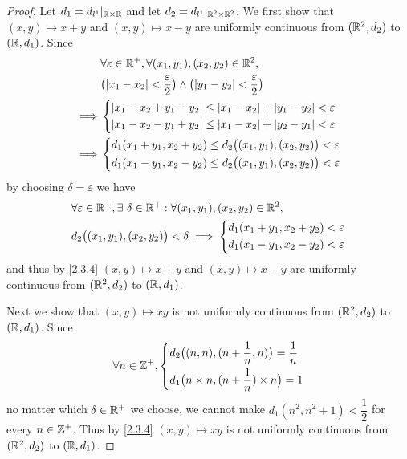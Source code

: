 \begin{proof}
  Let \(d_1 = d_{l^1}|_{\mathbb{R} \times \mathbb{R}}\) and let \(d_2 = d_{l^1}|_{\mathbb{R}^2 \times \mathbb{R}^2}\).
  We first show that \((x, y) \mapsto x + y\) and \((x, y) \mapsto x - y\) are uniformly continuous from \((\mathbb{R}^2, d_2)\) to \((\mathbb{R}, d_1)\).
  Since
  \begin{align*}
             & \forall \varepsilon \in \R^+, \forall (x_1, y_1), (x_2, y_2) \in \R^2,                                      \\
             & \big(\abs{x_1 - x_2} < \dfrac{\varepsilon}{2}\big) \land \big(\abs{y_1 - y_2} < \dfrac{\varepsilon}{2}\big) \\
    \implies & \begin{dcases}
                 \abs{x_1 - x_2 + y_1 - y_2} \leq \abs{x_1 - x_2} + \abs{y_1 - y_2} < \varepsilon \\
                 \abs{x_1 - x_2 - y_1 + y_2} \leq \abs{x_1 - x_2} + \abs{y_2 - y_1} < \varepsilon \\
               \end{dcases}                            \\
    \implies & \begin{dcases}
                 d_1(x_1 + y_1, x_2 + y_2) \leq d_2\big((x_1, y_1), (x_2, y_2)\big) < \varepsilon \\
                 d_1(x_1 - y_1, x_2 - y_2) \leq d_2\big((x_1, y_1), (x_2, y_2)\big) < \varepsilon
               \end{dcases}
  \end{align*}
  by choosing \(\delta = \varepsilon\) we have
  \begin{align*}
     & \forall \varepsilon \in \mathbb{R}^+, \exists\ \delta \in \mathbb{R}^+ : \forall (x_1, y_1), (x_2, y_2) \in \mathbb{R}^2, \\
     & d_2\big((x_1, y_1), (x_2, y_2)\big) < \delta \implies \begin{dcases}
                                                               d_1(x_1 + y_1, x_2 + y_2) < \varepsilon \\
                                                               d_1(x_1 - y_1, x_2 - y_2) < \varepsilon
                                                             \end{dcases}
  \end{align*}
  and thus by \cref{2.3.4} \((x, y) \mapsto x + y\) and \((x, y) \mapsto x - y\) are uniformly continuous from \((\mathbb{R}^2, d_2)\) to \((\mathbb{R}, d_1)\).

  Next we show that \((x, y) \mapsto xy\) is not uniformly continuous from \((\mathbb{R}^2, d_2)\) to \((\mathbb{R}, d_1)\).
  Since
  \[
    \forall n \in \mathbb{Z}^+, \begin{dcases}
      d_2\big((n, n), (n + \dfrac{1}{n}, n)\big) = \dfrac{1}{n} \\
      d_1\big(n \times n, (n + \dfrac{1}{n}) \times n\big) = 1
    \end{dcases}
  \]
  no matter which \(\delta \in \mathbb{R}^+\) we choose, we cannot make \(d_1(n^2, n^2 + 1) < \dfrac{1}{2}\) for every \(n \in \mathbb{Z}^+\).
  Thus by \cref{2.3.4} \((x, y) \mapsto xy\) is not uniformly continuous from \((\mathbb{R}^2, d_2)\) to \((\mathbb{R}, d_1)\).


\end{proof}
